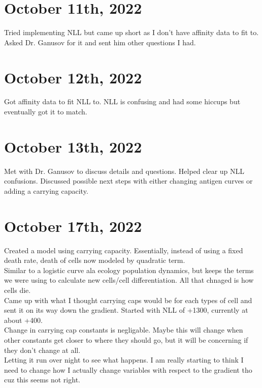 \documentclass[letterpaper,12pt]{article}
\begin{document}
\section{October 11th, 2022}
  Tried implementing NLL but came up short as I don't have affinity data to fit to. Asked Dr. Ganusov for it and sent him other questions I had. 

\section{October 12th, 2022}
  Got affinity data to fit NLL to. NLL is confusing and had some hiccups but eventually got it to match. 

\section{October 13th, 2022}
  Met with Dr. Ganusov to discuss details and questions. Helped clear up NLL confusions. Discussed possible next steps with either changing antigen curves or adding a carrying capacity.

\section{October 17th, 2022}
  Created a model using carrying capacity. Essentially, instead of using a fixed death rate, death of cells now modeled by quadratic term.
\\
  Similar to a logistic curve ala ecology population dynamics, but keeps the terms we were using to calculate new cells/cell differentiation. All that chnaged is how cells die.
\\
  Came up with what I thought carrying caps would be for each types of cell and sent it on its way down the gradient. Started with NLL of +1300, currently at about +400.
\\
  Change in carrying cap constants is negligable. Maybe this will change when other constants get closer to where they should go, but it will be concerning if they don't change at all.
\\
  Letting it run over night to see what happens. I am really starting to think I need to change how I actually change variables with respect to the gradient tho cuz this seems not right.
\end{document}
